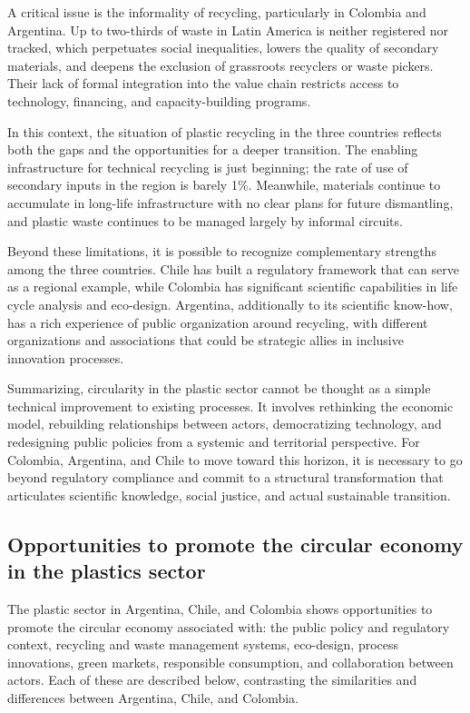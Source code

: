 \documentclass[
  12pt,
  oneside]{book}
\begin{document}
A critical issue is the informality of recycling, particularly in
Colombia and Argentina. Up to two-thirds of waste in Latin America is
neither registered nor tracked, which perpetuates social inequalities,
lowers the quality of secondary materials, and deepens the exclusion of
grassroots recyclers or waste pickers. Their lack of formal integration
into the value chain restricts access to technology, financing, and
capacity-building programs.

In this context, the situation of plastic recycling in the three
countries reflects both the gaps and the opportunities for a deeper
transition. The enabling infrastructure for technical recycling is just
beginning; the rate of use of secondary inputs in the region is barely
1\%. Meanwhile, materials continue to accumulate in long-life
infrastructure with no clear plans for future dismantling, and plastic
waste continues to be managed largely by informal circuits.

Beyond these limitations, it is possible to recognize complementary
strengths among the three countries. Chile has built a regulatory
framework that can serve as a regional example, while Colombia has
significant scientific capabilities in life cycle analysis and
eco-design. Argentina, additionally to its scientific know-how, has a
rich experience of public organization around recycling, with different
organizations and associations that could be strategic allies in
inclusive innovation processes.

Summarizing, circularity in the plastic sector cannot be thought as a
simple technical improvement to existing processes. It involves
rethinking the economic model, rebuilding relationships between actors,
democratizing technology, and redesigning public policies from a
systemic and territorial perspective. For Colombia, Argentina, and Chile
to move toward this horizon, it is necessary to go beyond regulatory
compliance and commit to a structural transformation that articulates
scientific knowledge, social justice, and actual sustainable transition.

\subsection{Opportunities to promote the circular economy in the
plastics
sector}\label{opportunities-to-promote-the-circular-economy-in-the-plastics-sector}

The plastic sector in Argentina, Chile, and Colombia shows opportunities
to promote the circular economy associated with: the public policy and
regulatory context, recycling and waste management systems, eco-design,
process innovations, green markets, responsible consumption, and
collaboration between actors. Each of these are described below,
contrasting the similarities and differences between Argentina, Chile,
and Colombia.
\end{document}
